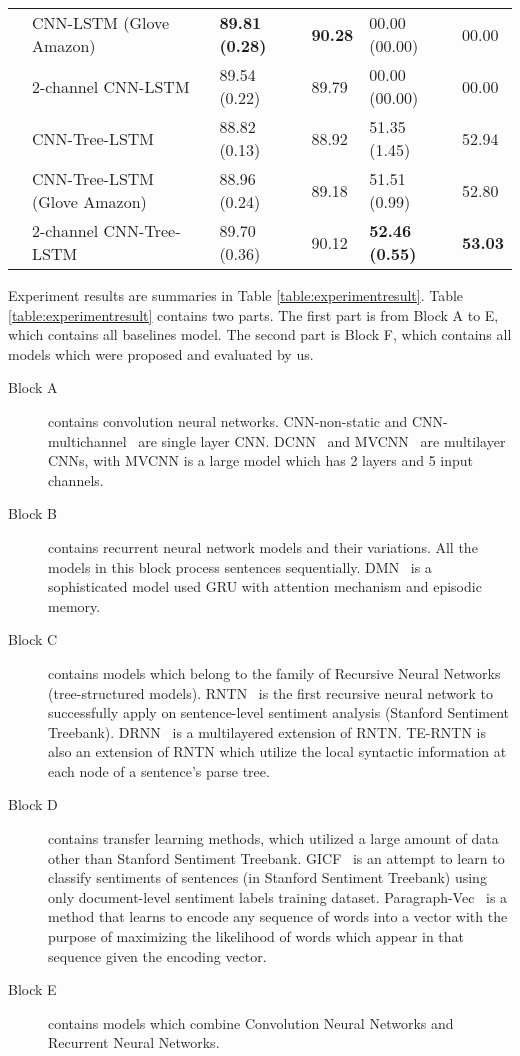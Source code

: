 \begin{table*}[]
\begin{tabular}{|c|l|ll|ll|}
		  & CNN-LSTM (Glove Amazon) & \textbf{89.81 (0.28)} & \textbf{90.28}  & 00.00 (00.00) & 00.00 \\
		& 2-channel CNN-LSTM                        & 89.54    (0.22) & 89.79 & 00.00 (00.00) & 00.00 \\
		 & CNN-Tree-LSTM                            & 88.82 (0.13) & 88.92 & 51.35 (1.45) & 52.94 \\
		& CNN-Tree-LSTM (Glove Amazon)             & 88.96 (0.24) & 89.18 & 51.51 (0.99) & 52.80 \\
		& 2-channel CNN-Tree-LSTM  & 89.70 (0.36) & 90.12  & \textbf{52.46 (0.55)} & \textbf{53.03} \Bstrut  \\
		\hline
	\end{tabular}
\end{table*}
Experiment results are summaries in Table \ref{table:experimentresult}.
Table \ref{table:experimentresult} contains two parts.
The first part is from Block A to E, which contains all baselines model.
The second part is Block F, which contains all models which were proposed and evaluated by us.
\begin{description}
	\item[Block A] contains convolution neural networks.
	CNN-non-static and CNN-multichannel~\cite{KimCNN} are single layer CNN.
	DCNN~\cite{DCNN} and MVCNN~\cite{2-layer-cnn} are multilayer CNNs, with MVCNN is a large model  which has 2 layers and 5 input channels.
	\item[Block B] contains recurrent neural network models and their variations.
	All the models in this block process sentences sequentially.
	DMN~\cite{attention-gru} is a sophisticated model used GRU with attention mechanism and episodic memory.
	\item[Block C] contains models which belong to the family of Recursive Neural Networks (tree-structured models).
	RNTN~\cite{socher2013recursive} is the first recursive neural network to successfully apply on sentence-level sentiment analysis (Stanford Sentiment Treebank).
	DRNN~\cite{IrsoyDRNN} is a multilayered extension of RNTN.
	TE-RNTN is also an extension of RNTN which utilize the local syntactic information at each node of a sentence's parse tree.
	\item[Block D] contains transfer learning methods, which utilized a large amount of data other than Stanford Sentiment Treebank.
	GICF~\cite{group-instance} is an attempt to learn to classify sentiments of sentences (in Stanford Sentiment Treebank) using only document-level sentiment labels training dataset.
	Paragraph-Vec~\cite{ParagraphVec} is a method that learns to encode any sequence of words into a vector with the purpose of maximizing the likelihood of words which appear in that sequence given the encoding vector.
	\item[Block E] contains models which combine Convolution Neural Networks and Recurrent Neural Networks.
\end{description}
